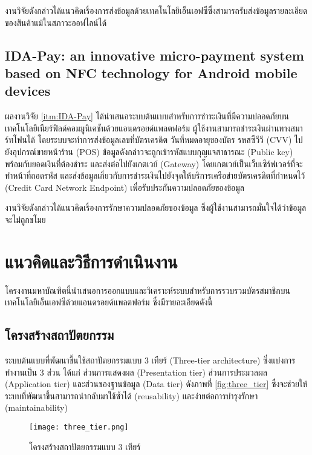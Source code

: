 \documentclass[a4paper]{article}
\begin{document}
งานวิจัยดังกล่าวได้แนวคิดเรื่องการส่งข้อมูลด้วยเทคโนโลยีเอ็นเอฟซีซึ่งสามารถรับส่งข้อมูลรายละเอียดของสินค้าแม้ในสภาวะออฟไลน์ได้

\subsection{IDA-Pay: an innovative micro-payment system based on NFC technology for Android mobile devices}
ผลงานวิจัย \ref{itm:IDA-Pay} ได้นำเสนอระบบต้นแบบสำหรับการชำระเงินที่มีความปลอดภัยบนเทคโนโลยีเนียร์ฟิลด์คอมมูนิเคชันด้วยแอนดรอยด์แพลตฟอร์ม ผู้ใช้งานสามารถชำระเงินผ่านทางสมาร์ทโฟนได้ โดยระบบจะทำการส่งข้อมูลเลขที่บัตรเครดิต วันที่หมดอายุของบัตร รหสซีวีวี (CVV) ไปยังอุปกรณ์ขายหน้าร้าน (POS) ข้อมูลดังกล่าวจะถูกเข้ารหัสแบบกุญแจสาธารณะ (Public key) พร้อมกับยอดเงินที่ต้องชำระ และส่งต่อไปยังเกตเวย์ (Gateway) โดยเกตเวย์เป็นเว็บเซิร์ฟเวอร์ที่จะทำหน้าที่ถอดรหัส และส่งข้อมูลเกี่ยวกับการชำระเงินไปยังจุดให้บริการเครือข่ายบัตรเครดิตที่กำหนดไว้ (Credit Card Network Endpoint) เพื่อรับประกันความปลอดภัยของข้อมูล

งานวิจัยดังกล่าวได้แนวคิดเรื่องการรักษาความปลอดภัยของข้อมูล ซึ่งผู้ใช้งานสามารถมั่นใจได้ว่าข้อมูลจะไม่ถูกขโมย


\section{แนวคิดและวิธีการดำเนินงาน}
โครงงานมหาบัณฑิตนี้นําเสนอการออกแบบและวิเคราะห์ระบบสำหรับการรวบรวมบัตรสมาชิกบนเทคโนโลยีเอ็นเอฟซีด้วยแอนดรอยด์แพลตฟอร์ม ซึ่งมีรายละเอียดดังนี้

\subsection{โครงสร้างสถาปัตยกรรม}
ระบบต้นแบบที่พัฒนาขึ้นใช้สถาปัตยกรรมแบบ 3 เทียร์ (Three-tier architecture) ซึ่งแบ่งการทำงานเป็น 3 ส่วน ได้แก่ ส่วนการแสดงผล (Presentation tier) ส่วนการประมวลผล (Application tier) และส่วนของฐานข้อมูล (Data tier) ดังภาพที่ \ref{fig:three_tier} ซึ่งจะช่วยให้ระบบที่พัฒนาขึ้นสามารถนำกลับมาใช้ซ้ำได้ (reusability) และง่ายต่อการบำรุงรักษา (maintainability)

\begin{figure}[ht!]
\centering
\texttt{[image: three\_tier.png]}
\caption{โครงสร้างสถาปัตยกรรมแบบ 3 เทียร์} \label{fig:three_tier}
\label{overflow}
\end{figure}
\end{document}
